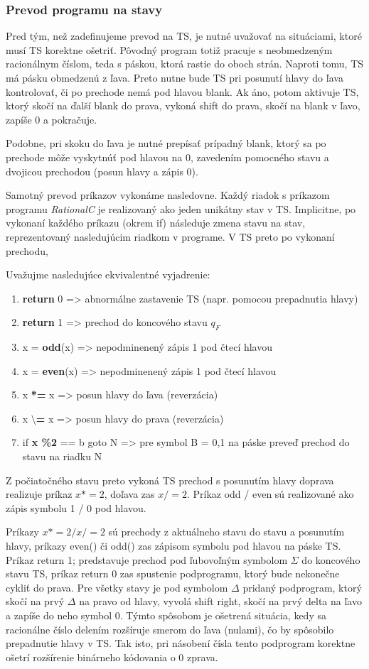 \documentclass[10pt]{article}
\begin{document}
\subsubsection*{Prevod programu na stavy}
Pred tým, než zadefinujeme prevod na TS, je nutné uvažovať na situáciami, ktoré musí TS korektne
ošetriť. Pôvodný program totiž pracuje s neobmedzeným racionálnym číslom, teda s páskou, ktorá
rastie do oboch strán. Naproti tomu, TS má pásku obmedzenú z ľava. Preto nutne bude TS pri posunutí
hlavy do ľava kontrolovať, či po prechode nemá pod hlavou blank. Ak áno, potom aktivuje TS, ktorý
skočí na ďalší blank do prava, vykoná shift do prava, skočí na blank v ľavo, zapíše 0 a pokračuje.

Podobne, pri skoku do ľava je nutné prepísať prípadný blank, ktorý sa po prechode môže vyskytnúť pod
hlavou na 0, zavedením pomocného stavu a dvojicou prechodou (posun hlavy a zápis 0).

Samotný prevod príkazov vykonáme nasledovne. Každý riadok s príkazom programu \textit{RationalC} je realizovaný ako jeden unikátny stav v TS.
Implicitne, po vykonaní každého príkazu (okrem if) následuje zmena stavu na stav, reprezentovaný
nasledujúcim riadkom v programe. V TS preto po vykonaní prechodu,  

Uvažujme nasledujúce ekvivalentné vyjadrenie:
\begin{enumerate}
    \item \textbf{return} 0 => abnormálne zastavenie TS (napr. pomocou prepadnutia hlavy)
    \item \textbf{return} 1 => prechod do koncového stavu $q_F$
    \item x = \textbf{odd}(x) => nepodminenený zápis 1 pod čtecí hlavou
    \item x = \textbf{even}(x) => nepodminenený zápis 1 pod čtecí hlavou
    \item x \textbf{*=} x => posun hlavy do ľava (reverzácia)
    \item x \textbf{$\setminus$=} x => posun hlavy do prava (reverzácia)
    \item if \textbf{x \%2} == b goto N => pre symbol B = {0,1} na páske preveď prechod do stavu na riadku N
\end{enumerate}

Z počiatočného stavu preto vykoná TS prechod s posunutím hlavy doprava realizuje príkaz $x *= 2$, doľava zas $x /= 2$. Príkaz odd /
even sú realizované ako zápis symbolu 1 / 0 pod hlavou.

Príkazy $x *= 2 / x /= 2$ sú prechody z aktuálneho stavu do stavu a posunutím hlavy,
príkazy even() či odd() zas zápisom symbolu pod hlavou na páske TS.
Príkaz return 1; predstavuje prechod pod ľubovoľným symbolom $\Sigma$ do koncového stavu TS,
príkaz return 0 zas spustenie podprogramu, ktorý bude nekonečne cykliť do prava.
Pre všetky stavy je pod symbolom $\Delta$ pridaný podprogram, ktorý skočí na prvý $\Delta$ na pravo od
hlavy, vyvolá shift right, skočí na prvý delta na ľavo a zapíše do neho symbol 0.
Týmto spôsobom je ošetrená situácia, kedy sa racionálne číslo delením rozšíruje smerom do ľava
(nulami), čo by spôsobilo prepadnutie hlavy v TS. 
Tak isto, pri násobení čísla tento podprogram korektne ošetrí rozšírenie binárneho kódovania o 0
zprava.
\end{document}
